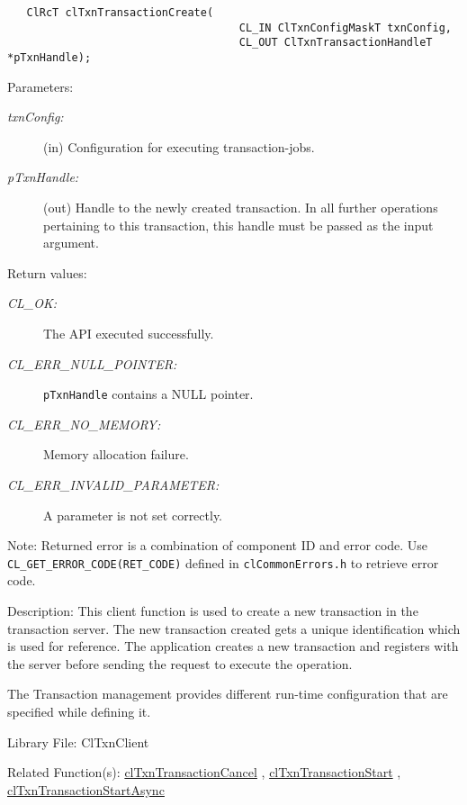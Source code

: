 \begin{flushleft}
\begin{Desc}
\footnotesize\begin{verbatim}   ClRcT clTxnTransactionCreate(
                               		CL_IN ClTxnConfigMaskT txnConfig,
                               		CL_OUT ClTxnTransactionHandleT *pTxnHandle);
\end{verbatim}
\normalsize
\end{Desc}
\begin{Desc}
\item[Parameters:]
\begin{description}
\item[{\em txn\-Config:}](in) Configuration for executing transaction-jobs. \item[{\em p\-Txn\-Handle:}](out) Handle to the newly created transaction.
In all further operations pertaining to this transaction, this handle must be passed as the input argument.\end{description}
\end{Desc}
\begin{Desc}
\item[Return values:]
\begin{description}
\item[{\em CL\_\-OK:}]The API executed successfully. 
\item[{\em CL\_\-ERR\_\-NULL\_\-POINTER:}]{\tt{pTxnHandle}} contains a NULL pointer. 
\item[{\em CL\_\-ERR\_\-NO\_\-MEMORY:}]Memory allocation failure. 
\item[{\em CL\_\-ERR\_\-INVALID\_\-PARAMETER:}]A parameter is not set correctly.\end{description}
\end{Desc}
\begin{Desc}
\item[Note:]Returned error is a combination of component ID and error code. Use {\tt{CL\_\-GET\_\-ERROR\_\-CODE(RET\_\-CODE)}} defined in 
{\tt{clCommonErrors.h}} to retrieve error code.\end{Desc}
\begin{Desc}
\item[Description:]This client function is used to create a new transaction in the transaction server. The new transaction created gets a unique
identification which is used for reference. The application creates a new transaction and registers with the server before sending the request to execute
the operation. \par
 \par
 The Transaction management provides different run-time configuration that are specified while defining it. 
\end{Desc}
\begin{Desc}
\item[Library File:]Cl\-Txn\-Client\end{Desc}
\begin{Desc}
\item[Related Function(s):]\hyperlink{pagetxn104}{cl\-Txn\-Transaction\-Cancel} , \hyperlink{pagetxn105}{cl\-Txn\-Transaction\-Start} ,
\hyperlink{pagetxn106}{cl\-Txn\-Transaction\-Start\-Async} \end{Desc}
\newpage


\end{flushleft}
